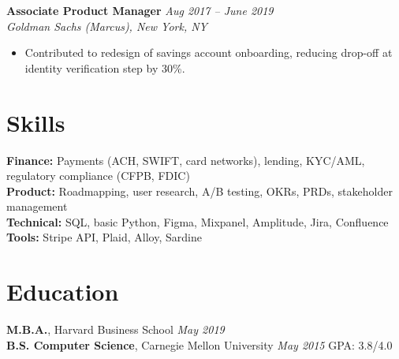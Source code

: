 \documentclass[11pt,a4paper]{article}
\begin{document}
\vspace{4pt}
\noindent\textbf{Associate Product Manager} \hfill \textit{Aug 2017 -- June 2019}\\
\textit{Goldman Sachs (Marcus), New York, NY}
\begin{itemize}
  \item Contributed to redesign of savings account onboarding, reducing drop-off at identity verification step by 30\%.
\end{itemize}

\section{Skills}
\textbf{Finance:} Payments (ACH, SWIFT, card networks), lending, KYC/AML, regulatory compliance (CFPB, FDIC)\\
\textbf{Product:} Roadmapping, user research, A/B testing, OKRs, PRDs, stakeholder management\\
\textbf{Technical:} SQL, basic Python, Figma, Mixpanel, Amplitude, Jira, Confluence\\
\textbf{Tools:} Stripe API, Plaid, Alloy, Sardine

\section{Education}
\textbf{M.B.A.}, Harvard Business School \hfill \textit{May 2019}\\
\textbf{B.S. Computer Science}, Carnegie Mellon University \hfill \textit{May 2015} \quad GPA: 3.8/4.0
\end{document}
